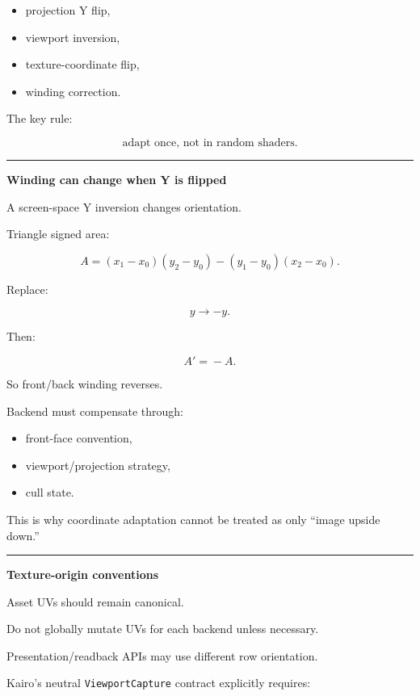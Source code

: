 \begin{itemize}
\tightlist
\item
  projection Y flip,
\item
  viewport inversion,
\item
  texture-coordinate flip,
\item
  winding correction.
\end{itemize}

The key rule:

\[
\boxed{
\text{adapt once, not in random shaders}.
}
\]

\begin{center}\rule{0.5\linewidth}{0.5pt}\end{center}

\textbf{Winding can change when Y is flipped}

A screen-space Y inversion changes orientation.

Triangle signed area:

\[
A=
(x_1-x_0)(y_2-y_0)
-
(y_1-y_0)(x_2-x_0).
\]

Replace:

\[
y\rightarrow-y.
\]

Then:

\[
A'\!=\!-A.
\]

So front/back winding reverses.

Backend must compensate through:

\begin{itemize}
\tightlist
\item
  front-face convention,
\item
  viewport/projection strategy,
\item
  cull state.
\end{itemize}

This is why coordinate adaptation cannot be treated as only ``image upside down.''

\begin{center}\rule{0.5\linewidth}{0.5pt}\end{center}

\textbf{Texture-origin conventions}

Asset UVs should remain canonical.

Do not globally mutate UVs for each backend unless necessary.

Presentation/readback APIs may use different row orientation.

Kairo's neutral \texttt{ViewportCapture} contract explicitly requires:

